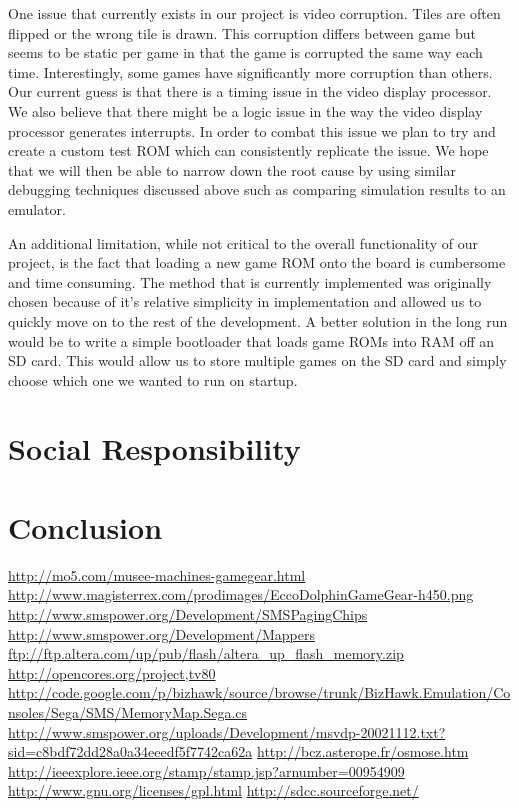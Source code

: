 \documentclass{article}
\begin{document}
One issue that currently exists in our project is video corruption. Tiles are
often flipped or the wrong tile is drawn. This corruption differs between game
but seems to be static per game in that the game is corrupted the same way each
time. Interestingly, some games have significantly more corruption than others.
Our current guess is that there is a timing issue in the video display
processor. We also believe that there might be a logic issue in the way the
video display processor generates interrupts. In order to combat this issue we
plan to try and create a custom test ROM which can consistently replicate the
issue.  We hope that we will then be able to narrow down the root cause by
using similar debugging techniques discussed above such as comparing simulation
results to an emulator.

An additional limitation, while not critical to the overall functionality of
our project, is the fact that loading a new game ROM onto the board is
cumbersome and time consuming. The method that is currently implemented was
originally chosen because of it's relative simplicity in implementation and
allowed us to quickly move on to the rest of the development.  A better
solution in the long run would be to write a simple bootloader that loads game
ROMs into RAM off an SD card. This would allow us to store multiple games on
the SD card and simply choose which one we wanted to run on startup.

\section{Social Responsibility}



\section{Conclusion}

\newpage
\begin{thebibliography}{9}
     \url{http://mo5.com/musee-machines-gamegear.html}
     \url{http://www.magisterrex.com/prodimages/EccoDolphinGameGear-h450.png}
     \url{http://www.smspower.org/Development/SMSPagingChips}
     \url{http://www.smspower.org/Development/Mappers}
     \url{ftp://ftp.altera.com/up/pub/flash/altera_up_flash_memory.zip}
     \url{http://opencores.org/project,tv80}
     \url{http://code.google.com/p/bizhawk/source/browse/trunk/BizHawk.Emulation/Consoles/Sega/SMS/MemoryMap.Sega.cs}
     \url{http://www.smspower.org/uploads/Development/msvdp-20021112.txt?sid=c8bdf72dd28a0a34eeedf5f7742ca62a}
     \url{http://bcz.asterope.fr/osmose.htm}
     \url{http://ieeexplore.ieee.org/stamp/stamp.jsp?arnumber=00954909}
     \url{http://www.gnu.org/licenses/gpl.html}
     \url{http://sdcc.sourceforge.net/}
\end{thebibliography}
\end{document}
